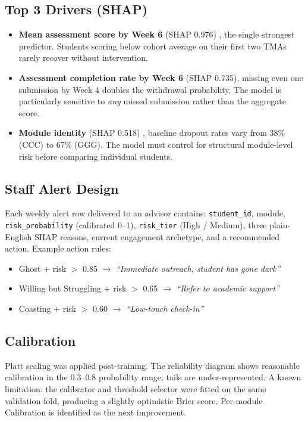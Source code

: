 \documentclass[10pt,a4paper]{article}
\begin{document}
\subsection{Top 3 Drivers (SHAP)}
\begin{itemize}
  \item \textbf{Mean assessment score by Week 6} (SHAP 0.976) , the single strongest predictor.
    Students scoring below cohort average on their first two TMAs rarely recover without
    intervention.
  \item \textbf{Assessment completion rate by Week 6} (SHAP 0.735), missing even one
    submission by Week 4 doubles the withdrawal probability. The model is particularly sensitive
    to \emph{any} missed submission rather than the aggregate score.
  \item \textbf{Module identity} (SHAP 0.518) , baseline dropout rates vary from 38\% (CCC)
    to 67\% (GGG). The model must control for structural module-level risk before comparing
    individual students.
\end{itemize}

\subsection{Staff Alert Design} Each weekly alert row delivered to an advisor contains:
\texttt{student\_id}, module, \texttt{risk\_probability} (calibrated 0–1),
\texttt{risk\_tier} (High / Medium), three plain-English SHAP reasons, current engagement
archetype, and a recommended action. Example action rules:

\begin{itemize}
  \item Ghost + risk $>$ 0.85 $\rightarrow$ \emph{``Immediate outreach, student has gone dark''}
  \item Willing but Struggling + risk $>$ 0.65 $\rightarrow$ \emph{``Refer to academic support''}
  \item Coasting + risk $>$ 0.60 $\rightarrow$ \emph{``Low-touch check-in''}
\end{itemize}

\subsection{Calibration} Platt scaling was applied post-training. The reliability diagram
shows reasonable calibration in the 0.3–0.8 probability range; tails are
under-represented. A known limitation: the calibrator and threshold selector were fitted on
the same validation fold, producing a slightly optimistic Brier score. Per-module
Calibration is identified as the next improvement.
\end{document}
